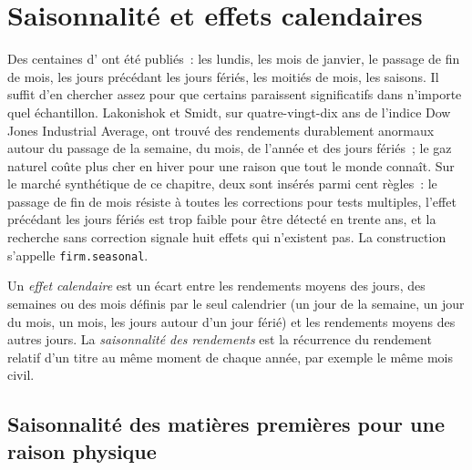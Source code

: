 \chapter{Saisonnalité et effets calendaires}\label{ch:s1:seasonality-and-calendar-effects}

Des centaines d' ont été publiés~: les lundis, les mois de janvier, le passage de fin de mois, les jours précédant les jours fériés, les moitiés de mois, les
saisons. Il suffit d'en chercher assez pour que certains paraissent significatifs dans n'importe quel échantillon. Lakonishok et Smidt, sur quatre-vingt-dix ans de l'indice Dow Jones Industrial
Average, ont trouvé des rendements durablement anormaux autour du passage de la semaine, du mois, de l'année et des jours fériés~; le gaz naturel coûte plus cher en hiver
pour une raison que tout le monde connaît. Sur le marché synthétique de ce chapitre, deux  sont insérés parmi cent règles~: le passage de fin de mois résiste
à toutes les corrections pour tests multiples, l'effet précédant les jours fériés est trop faible pour être détecté en trente ans, et la recherche sans correction signale huit
effets qui n'existent pas. La construction s'appelle \texttt{firm.seasonal}.

\begin{definition}\label{def:s1:seasonality-and-calendar-effects:calendar}
Un \emph{effet calendaire} est un écart entre les rendements moyens des jours, des semaines ou des mois définis par le seul calendrier (un
jour de la semaine, un jour du mois, un mois, les jours autour d'un jour férié) et les rendements moyens des autres jours. La \emph{saisonnalité des rendements}%
 est la récurrence du rendement relatif d'un titre au même moment de chaque année, par exemple le même mois civil.
\end{definition}

\section{Saisonnalité des matières premières pour une raison physique}

